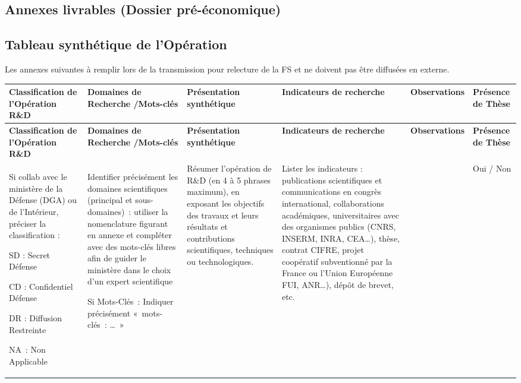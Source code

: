 \clearpage
\begin{landscape}
\section{Annexes livrables (Dossier pré-économique)}

\subsection{Tableau synthétique de l’Opération }


Les annexes suivantes à remplir lors de la transmission pour relecture de la FS et ne doivent pas être diffusées en externe.

\begingroup\scriptsize
\setlength{\tabcolsep}{3pt}
\begin{longtable}{|>{\raggedright\arraybackslash}p{2.0cm}|>{\raggedright\arraybackslash}p{4.0cm}|>{\raggedright\arraybackslash}p{7.7cm}|>{\raggedright\arraybackslash}p{6.2cm}|>{\raggedright\arraybackslash}p{1.9cm}|>{\raggedright\arraybackslash}p{1.8cm}|}
\hline
\rowcolor{TableHead} \textbf{Classification de l'Opération R\&D} & \textbf{Domaines de Recherche /Mots-clés} & \textbf{Présentation synthétique} & \textbf{Indicateurs de recherche} & \textbf{Observations} & \textbf{Présence de Thèse} \\ \hline
\endfirsthead
\rowcolor{TableHead} \textbf{Classification de l'Opération R\&D} & \textbf{Domaines de Recherche /Mots-clés} & \textbf{Présentation synthétique} & \textbf{Indicateurs de recherche} & \textbf{Observations} & \textbf{Présence de Thèse} \\ \hline
\endhead
Si collab avec le ministère de la Défense (DGA) ou de l’Intérieur, préciser la classification :\par SD : Secret Défense\par CD : Confidentiel Défense\par DR : Diffusion Restreinte\par NA~: Non Applicable & Identifier précisément les domaines scientifiques (principal et sous-domaines)~: utiliser la nomenclature figurant en annexe et compléter avec des mots-clés libres afin de guider le ministère dans le choix d’un expert scientifique\par Si Mots-Clés~: Indiquer précisément «~mots-clés~: …~»  & Résumer l’opération de R\&D (en 4 à 5 phrases maximum), en exposant les objectifs des travaux et leurs résultats et contributions scientifiques, techniques ou technologiques. & Lister les indicateurs : publications scientifiques et communications en congrès international, collaborations académiques, universitaires avec des organismes publics (CNRS, INSERM, INRA, CEA…), thèse, contrat CIFRE, projet coopératif subventionné par la France ou l’Union Européenne  FUI, ANR…), dépôt de brevet, etc. &  & Oui / Non \\ \hline

\end{longtable}
\end{landscape}
